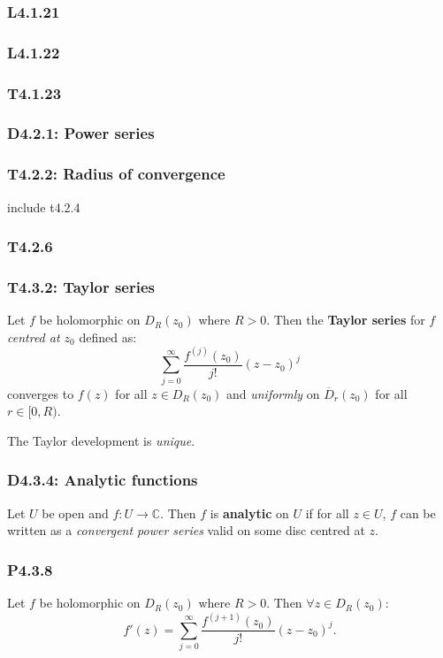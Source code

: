 \documentclass{article}
\begin{document}
\begin{multicols*}{3}
\subsubsection*{L4.1.21}

\subsubsection*{L4.1.22}

\subsubsection*{T4.1.23}

\newcolumn

\subsubsection*{D4.2.1: Power series}

\subsubsection*{T4.2.2: Radius of convergence}
include t4.2.4

\subsubsection*{T4.2.6}

\newcolumn

\subsubsection*{T4.3.2: Taylor series}
Let $f$ be holomorphic on $D_R(z_0)$ where $R>0$. Then the
\textbf{Taylor series} for $f$ \textit{centred at $z_0$} defined as:
$$\sum_{j=0}^{\infty}\frac{f^{(j)}(z_0)}{j!}(z-z_0)^j$$
converges to $f(z)$ for all $z\in D_R(z_0)$ and \textit{uniformly}
on $\overline{D}_r(z_0)$ for all $r\in[0,R)$.

The Taylor development is \textit{unique}.

\subsubsection*{D4.3.4: Analytic functions}
Let $U$ be open and $f:U\rightarrow\mathbb{C}$. Then $f$
is \textbf{analytic} on $U$ if for all $z\in U$, $f$ can be written
as a \textit{convergent power series} valid on some disc centred at $z$.

\subsubsection*{P4.3.8}
Let $f$ be holomorphic on $D_R(z_0)$ where $R>0$.
Then $\forall z\in D_R(z_0)$:
$$f'(z)=\sum_{j=0}^{\infty}\frac{f^{(j+1)}(z_0)}{j!}(z-z_0)^j.$$


\end{multicols*}
\end{document}
